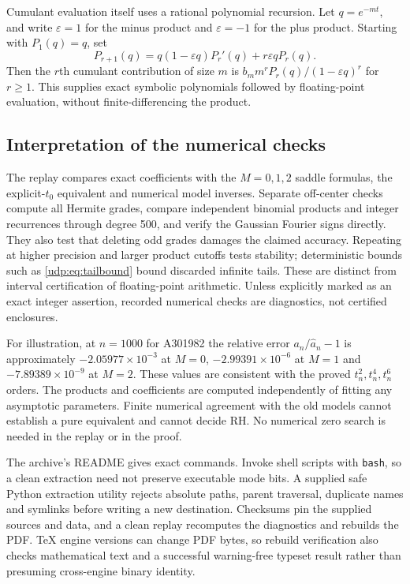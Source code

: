 \documentclass[11pt]{article}
\theoremstyle{remark}\newtheorem{remark}[theorem]{Remark}
\numberwithin{equation}{section}
\begin{document}
Cumulant evaluation itself uses a rational polynomial recursion. Let $q=e^{-mt}$, and write $\varepsilon=1$ for the minus product and $\varepsilon=-1$ for the plus product. Starting with $P_1(q)=q$, set
\begin{equation}\label{udp:eq:polyrec}
 P_{r+1}(q)=q(1-\varepsilon q)P_r'(q)+r\varepsilon qP_r(q).
\end{equation}
Then the $r$th cumulant contribution of size $m$ is $b_m m^r P_r(q)/(1-\varepsilon q)^r$ for $r\ge1$. This supplies exact symbolic polynomials followed by floating-point evaluation, without finite-differencing the product.

\subsection{Interpretation of the numerical checks}
The replay compares exact coefficients with the $M=0,1,2$ saddle formulas, the explicit-$t_0$ equivalent and numerical model inverses. Separate off-center checks compute all Hermite grades, compare independent binomial products and integer recurrences through degree 500, and verify the Gaussian Fourier signs directly. They also test that deleting odd grades damages the claimed accuracy. Repeating at higher precision and larger product cutoffs tests stability; deterministic bounds such as \eqref{udp:eq:tailbound} bound discarded infinite tails. These are distinct from interval certification of floating-point arithmetic. Unless explicitly marked as an exact integer assertion, recorded numerical checks are diagnostics, not certified enclosures.

For illustration, at $n=1000$ for A301982 the relative error $a_n/\widehat a_n-1$ is approximately $-2.05977\times10^{-3}$ at $M=0$, $-2.99391\times10^{-6}$ at $M=1$ and $-7.89389\times10^{-9}$ at $M=2$. These values are consistent with the proved $t_n^2,t_n^4,t_n^6$ orders. The products and coefficients are computed independently of fitting any asymptotic parameters. Finite numerical agreement with the old models cannot establish a pure equivalent and cannot decide RH. No numerical zero search is needed in the replay or in the proof.

The archive's README gives exact commands. Invoke shell scripts with \texttt{bash}, so a clean extraction need not preserve executable mode bits. A supplied safe Python extraction utility rejects absolute paths, parent traversal, duplicate names and symlinks before writing a new destination. Checksums pin the supplied sources and data, and a clean replay recomputes the diagnostics and rebuilds the PDF. TeX engine versions can change PDF bytes, so rebuild verification also checks mathematical text and a successful warning-free typeset result rather than presuming cross-engine binary identity.
\end{document}
